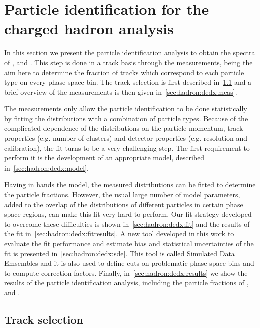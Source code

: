 \section{Particle identification for the charged hadron analysis}
\label{sec:hadron:dedx}


In this section we present the particle identification
analysis to obtain the spectra of \pions, \kaons and \protons.
This step is done in a track basis through the \dedx measurements,
being the aim here to determine the fraction of tracks which
correspond to each particle type on every phase space bin.
The track selection is first described in~\cref{sec:hadron:dedx:selection}
and a brief overview of the \dedx measurements is then given
in~\cref{sec:hadron:dedx:meas}.

The \dedx measurements only allow the particle identification
to be done statistically by fitting
the \dedx distributions with a combination of particle
types. Because of the complicated dependence of the \dedx
distributions on the particle momentum,
track properties (e.g. number of clusters) and
detector properties (e.g. resolution and calibration),
the \dedx fit turns to be a very challenging step.
The first requirement to perform it is the development
of an appropriate \dedx model, described in~\cref{sec:hadron:dedx:model}.

Having in hands the \dedx model, the measured \dedx
distributions can be fitted to determine the particle
fractions. However, the usual large number of
model parameters, added to the
overlap of the \dedx distributions
of different particles in certain phase space regions,
can make this fit very hard to perform.
Our fit strategy developed to overcome these difficulties is shown
in~\cref{sec:hadron:dedx:fit} and the results
of the fit in~\cref{sec:hadron:dedx:fitresults}. A new tool
developed in this work to evaluate the fit performance
and estimate bias and statistical uncertainties of the fit
is presented in~\cref{sec:hadron:dedx:sde}. This
tool is called Simulated Data Emsembles and
it is also used to define cuts on problematic
phase space bins and to compute correction factors.
Finally, in~\cref{sec:hadron:dedx:results} we show the results
of the particle identification analysis, including
the particle fractions of \pions, \kaons and \protons.


\subsection{Track selection}
\label{sec:hadron:dedx:selection}

